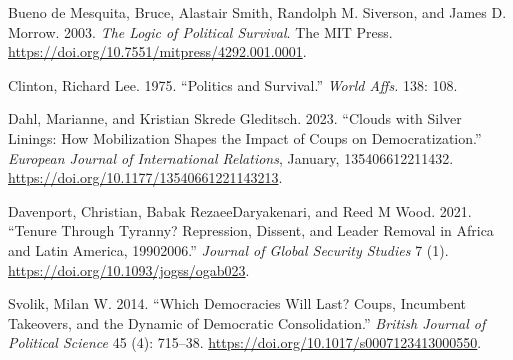 \documentclass[
  12pt,
  a4paper,
  DIV=11,
  numbers=noendperiod]{scrartcl}
\newlength{\cslhangindent}
\newlength{\cslentryspacingunit} %
\newenvironment{CSLReferences}[2] %
 {%
  \setlength{\parindent}{0pt}
  \ifodd #1
  \let\oldpar\par
  \def\par{\hangindent=\cslhangindent\oldpar}
  \fi
  \setlength{\parskip}{#2\cslentryspacingunit}
 }%
 {}
\begin{document}
\hypertarget{refs}{}
\begin{CSLReferences}{1}{0}
\leavevmode{}%
Bueno de Mesquita, Bruce, Alastair Smith, Randolph M. Siverson, and
James D. Morrow. 2003. \emph{The Logic of Political Survival}. The MIT
Press. \url{https://doi.org/10.7551/mitpress/4292.001.0001}.

\leavevmode{}%
Clinton, Richard Lee. 1975. {``Politics and Survival.''} \emph{World
Affs.} 138: 108.

\leavevmode{}%
Dahl, Marianne, and Kristian Skrede Gleditsch. 2023. {``Clouds with
Silver Linings: How Mobilization Shapes the Impact of Coups on
Democratization.''} \emph{European Journal of International Relations},
January, 135406612211432.
\url{https://doi.org/10.1177/13540661221143213}.

\leavevmode{}%
Davenport, Christian, Babak RezaeeDaryakenari, and Reed M Wood. 2021.
{``Tenure Through Tyranny? Repression, Dissent, and Leader Removal in
Africa and Latin America, 1990{\textendash}2006.''} \emph{Journal of
Global Security Studies} 7 (1).
\url{https://doi.org/10.1093/jogss/ogab023}.

\leavevmode{}%
Svolik, Milan W. 2014. {``Which Democracies Will Last? Coups, Incumbent
Takeovers, and the Dynamic of Democratic Consolidation.''} \emph{British
Journal of Political Science} 45 (4): 715--38.
\url{https://doi.org/10.1017/s0007123413000550}.

\end{CSLReferences}
\end{document}
